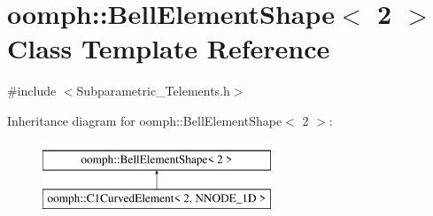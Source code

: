 \hypertarget{classoomph_1_1BellElementShape_3_012_01_4}{}\section{oomph\+:\+:Bell\+Element\+Shape$<$ 2 $>$ Class Template Reference}
\label{classoomph_1_1BellElementShape_3_012_01_4}


{\ttfamily \#include $<$Subparametric\+\_\+\+Telements.\+h$>$}

Inheritance diagram for oomph\+:\+:Bell\+Element\+Shape$<$ 2 $>$\+:\begin{figure}[H]
\begin{center}
\leavevmode
\includegraphics[height=2.000000cm]{classoomph_1_1BellElementShape_3_012_01_4}
\end{center}
\end{figure}
